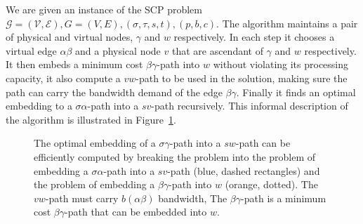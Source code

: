 \documentclass[runningheads]{llncs}
\newcommand{\scp}{\textsc{SCP}\xspace}
\newcommand{\calE}{\mathcal{E}}
\newcommand{\calG}{\mathcal{G}}
\newcommand{\calV}{\mathcal{V}}
\begin{document}
We are given an instance of the \scp{} problem 
$
\calG = (\calV, \calE),
G = (V, E),
(\sigma , \tau , s, t),
(p, b, c)
$.
The algorithm maintains a pair of physical and virtual nodes,
$\gamma$ and $w$ respectively.
In each step it chooses a virtual edge $\alpha\beta$ and a physical node $v$
that are ascendant of $\gamma$ and $w$ respectively.
It then embeds a minimum cost $\beta\gamma$-path into $w$ 
without violating its processing capacity,
it also compute a $vw$-path to be used in the solution, 
making sure the path can carry the bandwidth demand of the edge $\beta\gamma$.
Finally it finds an optimal embedding to a $\sigma\alpha$-path into a $sv$-path 
recursively.
This informal description of the algorithm is illustrated in Figure~\ref{fig:dp1}.

\begin{figure}[t]
\centering

\caption[]{
\label{fig:dp1}
The optimal embedding of a $\sigma \gamma $-path into a $sw$-path can be
efficiently computed by breaking the problem into the problem of embedding 
a $\sigma\alpha$-path into a $sv$-path (blue, dashed rectangles) 
and the problem of embedding a $\beta\gamma$-path into $w$ (orange, dotted).
The $vw$-path must carry $b(\alpha\beta)$ bandwidth, 
The $\beta\gamma$-path is a minimum cost $\beta\gamma$-path 
that can be embedded into $w$.
}
\end{figure}
\end{document}
